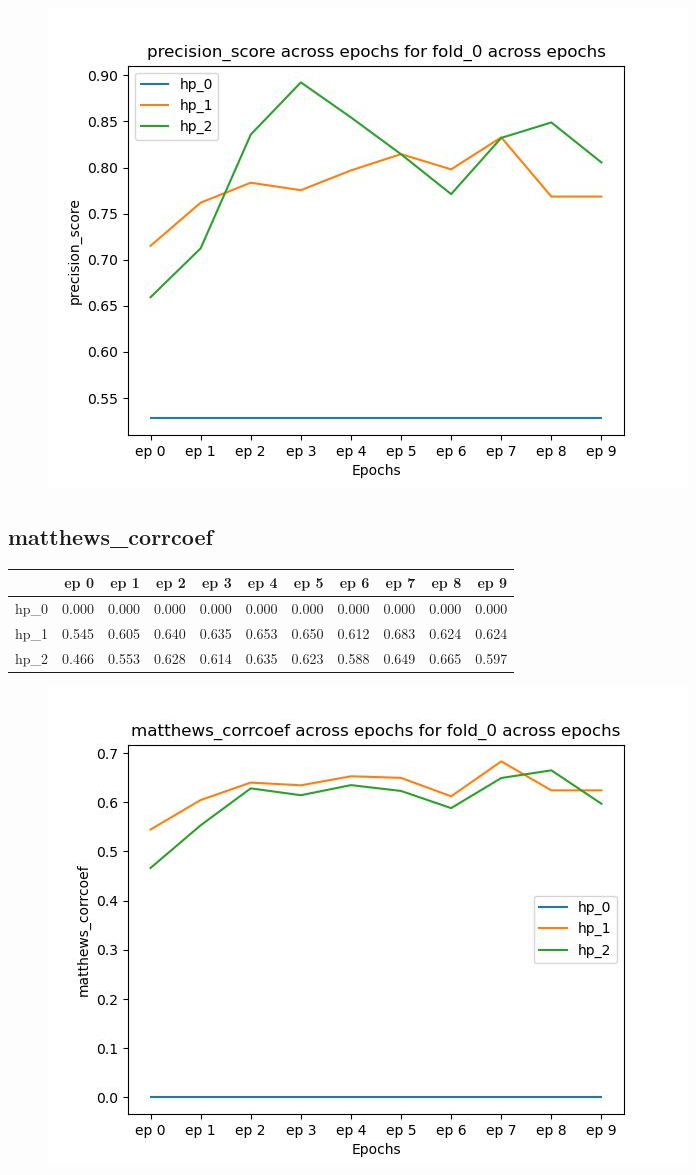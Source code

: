 \documentclass{article}
\begin{document}
\begin{figure}[H]
\includegraphics[scale = 0.75]{fold_0/precision_score}
\end{figure}
\subsection{matthews\_corrcoef}
\begin{tabular}{lrrrrrrrrrr}
\toprule
{} &   ep 0 &   ep 1 &   ep 2 &   ep 3 &   ep 4 &   ep 5 &   ep 6 &   ep 7 &   ep 8 &   ep 9 \\
\midrule
hp\_0 &  0.000 &  0.000 &  0.000 &  0.000 &  0.000 &  0.000 &  0.000 &  0.000 &  0.000 &  0.000 \\
hp\_1 &  0.545 &  0.605 &  0.640 &  0.635 &  0.653 &  0.650 &  0.612 &  0.683 &  0.624 &  0.624 \\
hp\_2 &  0.466 &  0.553 &  0.628 &  0.614 &  0.635 &  0.623 &  0.588 &  0.649 &  0.665 &  0.597 \\
\bottomrule
\end{tabular}

\begin{figure}[H]
\includegraphics[scale = 0.75]{fold_0/matthews_corrcoef}
\end{figure}
\end{document}
